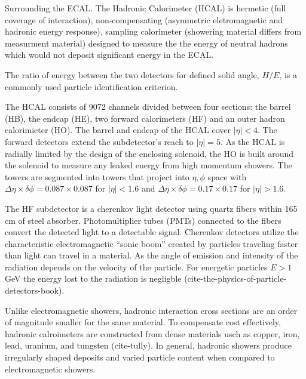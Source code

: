 Surrounding the ECAL. The Hadronic Calorimeter (HCAL) is hermetic (full coverage of interaction), non-compensating (asymmetric eletromagnetic and hadronic energy response), sampling calorimeter (showering material differs from measurment material) designed to measure the the energy of neutral hadrons which would not deposit significant energy in the ECAL. 

 The ratio of energy between the two detectors for defined solid angle, $H/E$, is a 
commonly used particle identification criterion. 

The HCAL consists of 9072 channels divided between four sections: the barrel (HB), the endcap (HE), 
two forward calorimeters (HF) and an outer hadron calorimieter (HO). The barrel
 and endcap of the HCAL cover $|\eta| < 4$. The forward detectors extend the subdetector's reach to $|\eta| =5$. 
As the HCAL is radially limited by the design of the enclosing solenoid, 
the HO is built around the solenoid to measure any leaked energy from high momentum showers. The towers are segmented into towers that project into $\eta,\phi$ space with $\Delta \eta \times\delta \phi= 0.087 \times 0.087$ for $|\eta| < 1.6$ and 
$\Delta \eta \times\delta \phi= 0.17 \times 0.17$ for $|\eta| > 1.6$. 

The HF subdetector is a cherenkov light detector using quartz fibers within 165 cm of steel absorber. 
Photomultiplier tubes (PMTs) connected to the fibers convert the detected light to a detectable signal. Cherenkov detectors
 utilize the characteristic electromagnetic ``sonic boom'' created by particles traveling faster than light can travel in
 a material. As the angle of emission and intensity of the radiation depends on the velocity of the particle. For energetic
particles $E>1$ GeV the energy lost to the radiation is negligble (cite-the-physics-of-particle-detectors-book).

Unlike electromagnetic showers, hadronic interaction cross sections are an order of magnitude smaller for the same material. To compensate cost effectively, hadronic calroimeters are constructed from dense materials usch as copper,
 iron, lead, uranium, and tungsten (cite-tully). In general, hadronic showers produce irregularly 
shaped deposits and varied particle content when compared to electromagnetic showers. 
 
